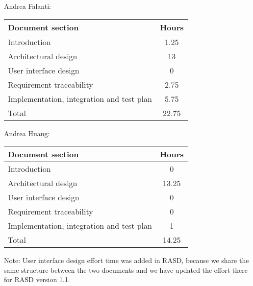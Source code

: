 Andrea Falanti:

\begin{tabular}{|l|c|}
    \hline
    Document section & Hours \\
    \hline
     Introduction & 1.25\\
     Architectural design & 13\\
     User interface design & 0\\
     Requirement traceability & 2.75\\
     Implementation, integration and test plan & 5.75\\
     \hline
     Total & 22.75\\
     \hline
\end{tabular}
\vskip 0.3in

Andrea Huang:

\begin{tabular}{|l|c|}
    \hline
    Document section & Hours \\
    \hline
     Introduction & 0\\
     Architectural design & 13.25\\
     User interface design & 0\\
     Requirement traceability & 0\\
     Implementation, integration and test plan & 1\\
     \hline
     Total & 14.25\\
     \hline
\end{tabular}

\bigskip
\bigskip
Note: User interface design effort time was added in RASD, because we share the same structure between the two documents and we have updated the effort there for RASD version 1.1. 